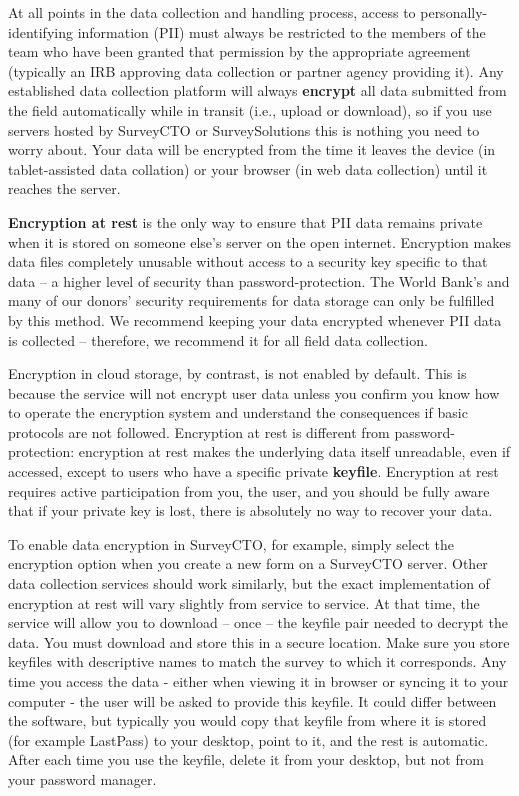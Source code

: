 At all points in the data collection and handling process,
access to personally-identifying information (PII)
must always be restricted to the members of the team
who have been granted that permission by the appropriate agreement
(typically an IRB approving data collection or partner agency providing it).
Any established data collection platform will always \textbf{encrypt}
all data submitted from the field automatically while in transit
(i.e., upload or download), so if you use servers hosted by SurveyCTO
or SurveySolutions this is nothing you need to worry about.
Your data will be encrypted from the time it leaves the device
(in tablet-assisted data collation) or your browser (in web data collection)
until it reaches the server.

\textbf{Encryption at rest} is the only way to ensure
that PII data remains private when it is stored
on someone else's server on the open internet.
Encryption makes data files completely unusable
without access to a security key specific to that data --
a higher level of security than password-protection.
The World Bank's and many of our donors' security requirements
for data storage can only be fulfilled by this method.
We recommend keeping your data encrypted whenever PII data is collected --
therefore, we recommend it for all field data collection.

Encryption in cloud storage, by contrast, is not enabled by default.
This is because the service will not encrypt user data unless you confirm
you know how to operate the encryption system and understand the consequences if basic protocols are not followed.
Encryption at rest is different from password-protection:
encryption at rest makes the underlying data itself unreadable,
even if accessed, except to users who have a specific private \textbf{keyfile}.
Encryption at rest requires active participation from you, the user,
and you should be fully aware that if your private key is lost,
there is absolutely no way to recover your data.

To enable data encryption in SurveyCTO, for example,
simply select the encryption option
when you create a new form on a SurveyCTO server.
Other data collection services should work similarly,
but the exact implementation of encryption at rest
will vary slightly from service to service.
At that time, the service will allow you to download -- once --
the keyfile pair needed to decrypt the data.
You must download and store this in a secure location.
Make sure you store keyfiles with descriptive names to match the survey to which it corresponds.
Any time you access the data - either when viewing it in browser or syncing it to your
computer - the user will be asked to provide this keyfile. It could differ between the software,
but typically you would copy that keyfile from where it is stored (for example LastPass)
to your desktop, point to it, and the rest is automatic.
After each time you use the keyfile, delete it from your desktop,
but not from your password manager.

